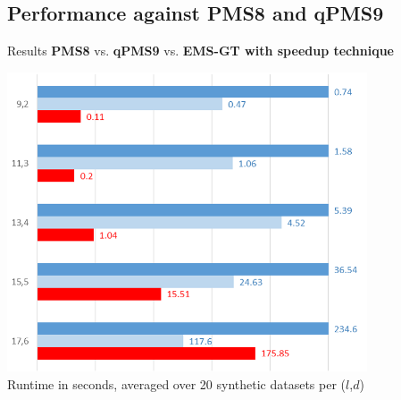 \documentclass[pdf,xcolor={dvipsnames}]{beamer}
\begin{document}
	\subsection{Performance against PMS8 and qPMS9}
	\begin{frame}{Results}{ {\bf\color{blue}PMS8} vs. {\bf\color{blue}qPMS9} vs. {\bf\color{red}EMS-GT with speedup technique} }%

		{\centering \includegraphics[width=0.8\textwidth]{img/results2.png}\\
		\footnotesize Runtime in seconds, averaged over 20 synthetic datasets per ($l$,$d$) \\}

		\end{frame}
\end{document}
